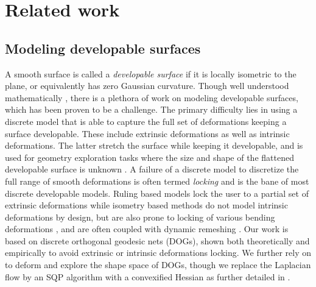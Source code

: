 \section{Related work}
\subsection{Modeling developable surfaces}
A smooth surface is called a \textit{developable surface} if it is locally isometric to the plane, or equivalently has zero Gaussian curvature. Though well understood mathematically \cite{do_carmo,spivak,computational_line}, there is a plethora of work on modeling developable surfaces, which has been proven to be a challenge. The primary difficulty lies in using a discrete model that is able to capture the full set of deformations keeping a surface developable. These include extrinsic deformations as well as intrinsic deformations. The latter stretch the surface while keeping it developable, and is used for geometry exploration tasks where the size and shape of the flattened developable surface is unknown \cite{conical,pottmann_new,rabi2018shape}. A failure of a discrete model to discretize the full range of smooth deformations is often termed \textit{locking} \cite{solomon,locking1} and is the bane of most discrete developable models. Ruling based models \cite{conical,curved_folding_kilian,pottmann_new,stein_dev} lock the user to a partial set of extrinsic deformations while isometry based methods \cite{grin_shells,shells, goldenthal2007efficient,froh_botsch} do not model intrinsic deformations by design, but are also prone to locking of various bending deformations \cite{locking1,locking2}, and are often coupled with dynamic remeshing \cite{narain2012adaptive,StringActuated:2017,Narain,SchreckEG2017}.  Our work is based on discrete orthogonal geodesic nets \cite{rabi18} (DOGs), shown both theoretically and empirically to avoid extrinsic or intrinsic deformations locking. We further rely on \cite{rabi2018shape} to deform and explore the shape space of DOGs, though we replace the Laplacian flow by an SQP algorithm with a convexified Hessian as further detailed in .
